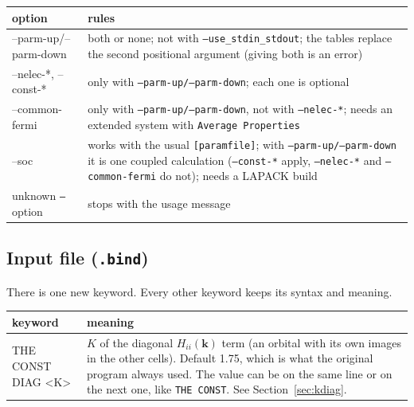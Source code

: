 \documentclass[11pt,a4paper]{article}
\newcommand{\opt}[1]{\texttt{#1}}
\begin{document}
\begin{center}
\begin{tabularx}{\textwidth}{>{\ttfamily}l X}
\toprule
\textrm{\textbf{option}} & \textbf{rules} \\
\midrule
--parm-up/--parm-down & both or none; not with \texttt{--use\_stdin\_stdout}; the
  tables replace the second positional argument (giving both is an error) \\
--nelec-*, --const-* & only with \texttt{--parm-up/--parm-down}; each one is optional \\
--common-fermi & only with \texttt{--parm-up/--parm-down}, not with \opt{--nelec-*};
  needs an extended system with \texttt{Average Properties} \\
--soc & works with the usual \texttt{[paramfile]}; with \opt{--parm-up/--parm-down} it is
  one coupled calculation (\opt{--const-*} apply, \opt{--nelec-*} and
  \opt{--common-fermi} do not); needs a LAPACK build \\
unknown \texttt{--}option & stops with the usage message \\
\bottomrule
\end{tabularx}
\end{center}

\subsection{Input file (\texttt{.bind})}

There is one new keyword. Every other keyword keeps its syntax and meaning.

\begin{center}
\begin{tabularx}{\textwidth}{>{\ttfamily}l X}
\toprule
\textrm{\textbf{keyword}} & \textbf{meaning} \\
\midrule
THE CONST DIAG <K> & $K$ of the diagonal $H_{ii}(\mathbf{k})$ term (an orbital with its
  own images in the other cells). Default 1.75, which is what the original program
  always used. The value can be on the same line or on the next one, like
  \texttt{THE CONST}. See Section~\ref{sec:kdiag}. \\
\bottomrule
\end{tabularx}
\end{center}
\end{document}
